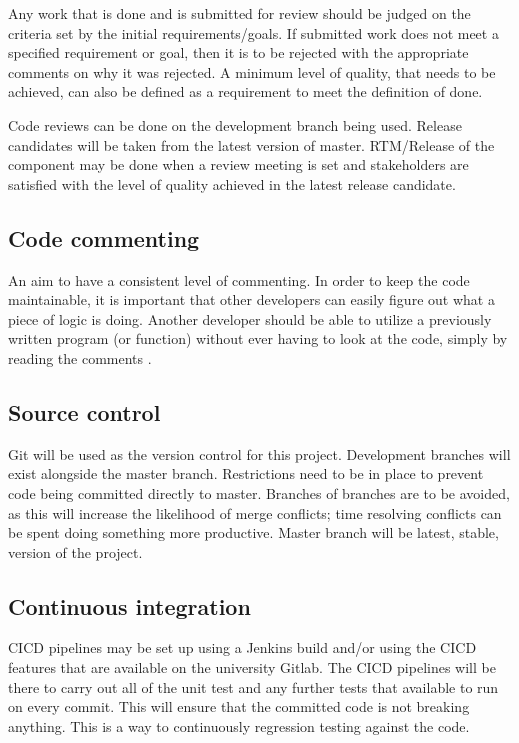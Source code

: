 Any work that is done and is submitted for review should be judged on the criteria set by the initial
requirements/goals. If submitted work does not meet a specified requirement or goal, then it is to
be rejected with the appropriate comments on why it was rejected. A minimum level of quality, that
needs to be achieved, can also be defined as a requirement to meet the definition of done.

Code reviews can be done on the development branch being used. Release candidates will be taken
from the latest version of master. RTM/Release of the component may be done when a review
meeting is set and stakeholders are satisfied with the level of quality achieved in the latest release
candidate.

\subsection{Code commenting}
An aim to have a consistent level of commenting. In order to keep the code maintainable, it is
important that other developers can easily figure out what a piece of logic is doing. Another developer should be
able to utilize a previously written program (or function) without ever having to look at the code, simply
by reading the comments \cite{germain2010commenting}.

\subsection{Source control}
Git will be used as the version control for this project. Development branches will exist alongside the
master branch. Restrictions need to be in place to prevent code being committed directly to master.
Branches of branches are to be avoided, as this will increase the likelihood of merge conflicts; time
resolving conflicts can be spent doing something more productive. Master branch will be latest,
stable, version of the project.


\subsection{Continuous integration}
CICD pipelines may be set up using a Jenkins build and/or using the CICD features that are available on
the university Gitlab. The CICD pipelines will be there to carry out all of the unit test and any further
tests that available to run on every commit. This will ensure that the committed code is not breaking
anything. This is a way to continuously regression testing against the code.

